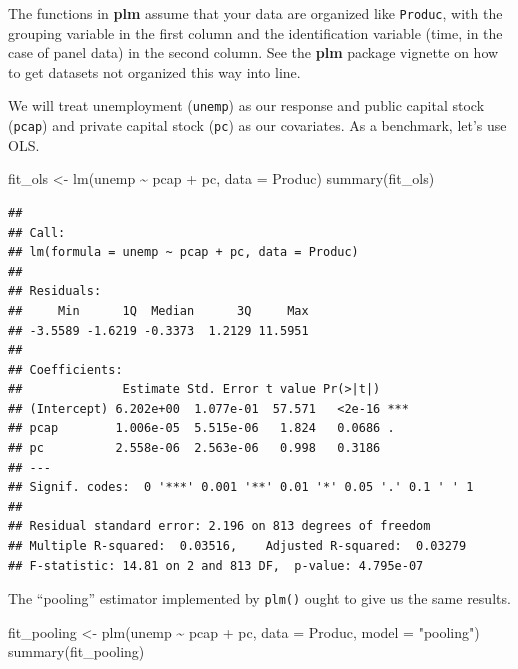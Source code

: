 \documentclass[
  12pt,
  oneside,openany]{book}
\newenvironment{Shaded}{\begin{snugshade}}{\end{snugshade}}
\newcommand{\AttributeTok}[1]{\textcolor[rgb]{0.77,0.63,0.00}{#1}}
\newcommand{\FunctionTok}[1]{\textcolor[rgb]{0.00,0.00,0.00}{#1}}
\newcommand{\NormalTok}[1]{#1}
\newcommand{\OtherTok}[1]{\textcolor[rgb]{0.56,0.35,0.01}{#1}}
\newcommand{\SpecialCharTok}[1]{\textcolor[rgb]{0.00,0.00,0.00}{#1}}
\newcommand{\StringTok}[1]{\textcolor[rgb]{0.31,0.60,0.02}{#1}}
\begin{document}
The functions in \textbf{plm} assume that your data are organized like \texttt{Produc}, with the grouping variable in the first column and the identification variable (time, in the case of panel data) in the second column. See the \textbf{plm} package vignette on how to get datasets not organized this way into line.

We will treat unemployment (\texttt{unemp}) as our response and public capital stock (\texttt{pcap}) and private capital stock (\texttt{pc}) as our covariates. As a benchmark, let's use OLS.

\begin{Shaded}
\begin{Highlighting}[]
\NormalTok{fit\_ols }\OtherTok{\textless{}{-}} \FunctionTok{lm}\NormalTok{(unemp }\SpecialCharTok{\textasciitilde{}}\NormalTok{ pcap }\SpecialCharTok{+}\NormalTok{ pc,}
              \AttributeTok{data =}\NormalTok{ Produc)}
\FunctionTok{summary}\NormalTok{(fit\_ols)}
\end{Highlighting}
\end{Shaded}

\begin{verbatim}
## 
## Call:
## lm(formula = unemp ~ pcap + pc, data = Produc)
## 
## Residuals:
##     Min      1Q  Median      3Q     Max 
## -3.5589 -1.6219 -0.3373  1.2129 11.5951 
## 
## Coefficients:
##              Estimate Std. Error t value Pr(>|t|)    
## (Intercept) 6.202e+00  1.077e-01  57.571   <2e-16 ***
## pcap        1.006e-05  5.515e-06   1.824   0.0686 .  
## pc          2.558e-06  2.563e-06   0.998   0.3186    
## ---
## Signif. codes:  0 '***' 0.001 '**' 0.01 '*' 0.05 '.' 0.1 ' ' 1
## 
## Residual standard error: 2.196 on 813 degrees of freedom
## Multiple R-squared:  0.03516,    Adjusted R-squared:  0.03279 
## F-statistic: 14.81 on 2 and 813 DF,  p-value: 4.795e-07
\end{verbatim}

The ``pooling'' estimator implemented by \texttt{plm()} ought to give us the same results.

\begin{Shaded}
\begin{Highlighting}[]
\NormalTok{fit\_pooling }\OtherTok{\textless{}{-}} \FunctionTok{plm}\NormalTok{(unemp }\SpecialCharTok{\textasciitilde{}}\NormalTok{ pcap }\SpecialCharTok{+}\NormalTok{ pc,}
                   \AttributeTok{data =}\NormalTok{ Produc,}
                   \AttributeTok{model =} \StringTok{"pooling"}\NormalTok{)}
\FunctionTok{summary}\NormalTok{(fit\_pooling)}
\end{Highlighting}
\end{Shaded}
\end{document}
